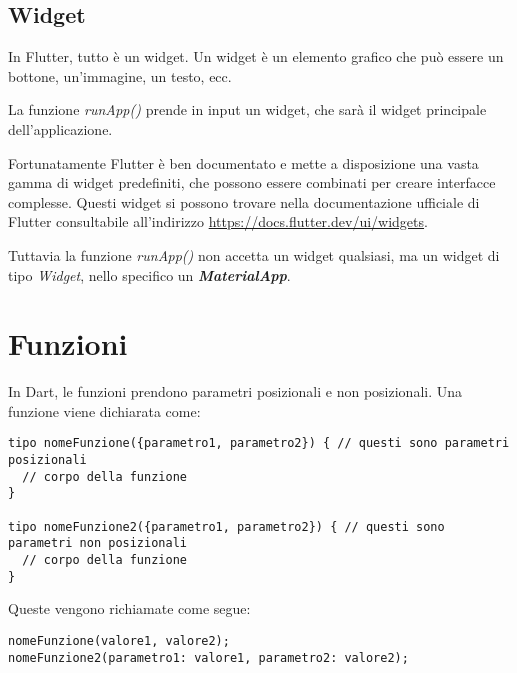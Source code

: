 \documentclass[12pt]{article}
\begin{document}
\subsection{Widget}
In Flutter, tutto è un widget. Un widget è un elemento grafico
che può essere un bottone, un'immagine, un testo, ecc.

La funzione \textit{runApp()} prende in input un widget, che sarà
il widget principale dell'applicazione.

Fortunatamente Flutter è ben documentato e mette a disposizione
una vasta gamma di widget predefiniti, che possono essere combinati
per creare interfacce complesse. Questi widget si possono
trovare nella documentazione ufficiale di Flutter consultabile
all'indirizzo \url{https://docs.flutter.dev/ui/widgets}.

Tuttavia la funzione \textit{runApp()} non accetta un widget qualsiasi,
ma un widget di tipo \textit{Widget}, nello specifico un \textit{\textbf{MaterialApp}}.


\section{Funzioni}
In Dart, le funzioni prendono
parametri posizionali e non posizionali. Una funzione
viene dichiarata come:
\begin{verbatim}
tipo nomeFunzione({parametro1, parametro2}) { // questi sono parametri posizionali
  // corpo della funzione
}

tipo nomeFunzione2({parametro1, parametro2}) { // questi sono parametri non posizionali
  // corpo della funzione
}
\end{verbatim}

Queste vengono richiamate come segue:
\begin{verbatim} 
nomeFunzione(valore1, valore2);
nomeFunzione2(parametro1: valore1, parametro2: valore2);
\end{verbatim}
\end{document}
